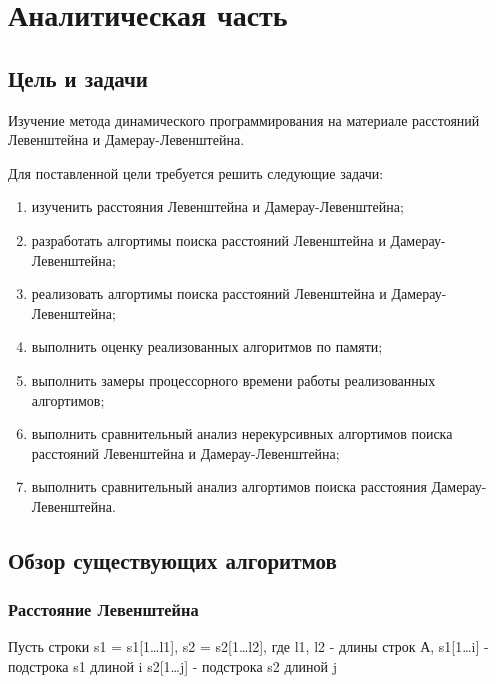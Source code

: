 \section{Аналитическая часть}

\subsection{Цель и задачи}

Изучение метода динамического программирования на материале расстояний Левенштейна и Дамерау-Левенштейна.

Для поставленной цели требуется решить следующие задачи:

\begin{enumerate}[leftmargin=1.6\parindent]
	\item изученить расстояния Левенштейна и Дамерау-Левенштейна;
	\item разработать алгортимы поиска расстояний Левенштейна и Дамерау-Левенштейна;
	\item реализовать алгортимы поиска расстояний Левенштейна и Дамерау-Левенштейна;
	\item выполнить оценку реализованных алгоритмов по памяти;
	\item выполнить замеры процессорного времени работы реализованных алгортимов;
	\item выполнить сравнительный анализ нерекурсивных алгортимов поиска расстояний Левенштейна и Дамерау-Левенштейна;
	\item выполнить сравнительный анализ алгортимов поиска расстояния \newline Дамерау-Левенштейна.
\end{enumerate}
\pagebreak
\subsection{Обзор существующих алгоритмов}

\subsubsection{Расстояние Левенштейна}
Пусть строки s1 = s1[1\dots l1], s2 = s2[1\dots l2], где\newline
l1, l2 - длины строк\newline
А, s1[1\dots i] - подстрока s1 длиной i\newline
s2[1\dots j] - подстрока s2 длиной j

